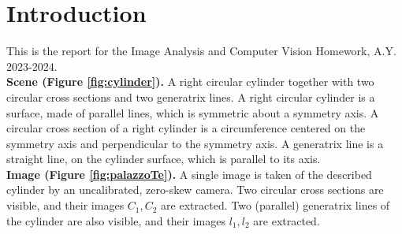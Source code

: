 \documentclass[12pt,a4paper]{article}
\begin{document}
\nocite{bookCV}



\setcounter{section}{-1}

\tableofcontents
\listoffigures

\section{Introduction}
\label{sec:introduction}
This is the report for the Image Analysis and Computer Vision Homework, A.Y. 2023-2024.\\

\textbf{Scene (Figure \ref{fig:cylinder}).} A right circular cylinder together with two circular cross sections and two generatrix lines. A right circular cylinder is a surface, made of parallel lines, which is
symmetric about a symmetry axis. A circular cross section of a right cylinder is a circumference
centered on the symmetry axis and perpendicular to the symmetry axis. A generatrix line is a
straight line, on the cylinder surface, which is parallel to its axis.\\

\textbf{Image (Figure \ref{fig:palazzoTe}).} A single image is taken of the described cylinder by an uncalibrated, zero-skew camera. Two circular cross sections are visible, and their images $C_1,C_2$ are extracted. Two (parallel) generatrix lines of the cylinder are also visible, and their images $l_1,l_2$ are extracted.
\end{document}
